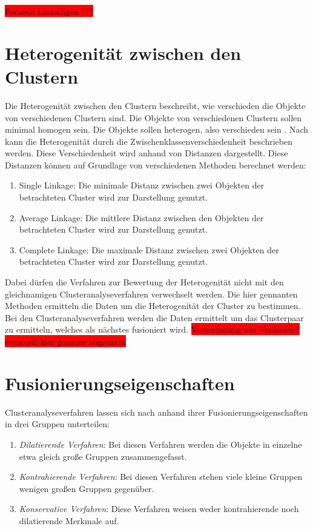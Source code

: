 \colorbox{red}{Formeln hinzufügen ???}
\section{Heterogenität zwischen den Clustern}
Die Heterogenität zwischen den Clustern beschreibt, wie verschieden die Objekte von verschiedenen Clustern sind. Die Objekte von verschiedenen Clustern sollen minimal homogen sein. Die Objekte sollen heterogen, also verschieden sein \citep[Vgl.][S. 16]{Bacher.2010}.
Nach \citet[S. 181]{Bankhofer.2008} kann die Heterogenität durch die Zwischenklassenverschiedenheit beschrieben werden. Diese Verschiedenheit wird anhand von Distanzen dargestellt. Diese Distanzen können auf Grundlage von verschiedenen Methoden berechnet werden:
\begin{enumerate}
        \item Single Linkage: Die minimale Distanz zwischen zwei Objekten der betrachteten Cluster wird zur Darstellung genutzt.
        \item Average Linkage: Die mittlere Distanz zwischen den Objekten der betrachteten Cluster wird zur Darstellung genutzt.
        \item Complete Linkage: Die maximale Distanz zwischen zwei Objekten der betrachteten Cluster wird zur Darstellung genutzt.
\end{enumerate}
Dabei dürfen die Verfahren zur Bewertung der Heterogenität nicht mit den gleichnamigen Clusteranalyseverfahren verwechselt werden. Die hier gennanten Methoden ermitteln die Daten um die Heterogenität der Cluster zu bestimmen. Bei den Clusteranalyseverfahren werden die Daten ermittelt um das Clusterpaar zu ermitteln, welches als nächstes fusioniert wird. 
\colorbox{red}{Verwechslung mit Verfahren? eventuell hier genauer abgrenzen} 

\section{Fusionierungseigenschaften}
Clusteranalyseverfahren lassen sich nach \citet[S. 488/489]{Backhaus.2016} anhand ihrer Fusionierungseigenschaften in drei Gruppen unterteilen:
\begin{enumerate}
        \item \textit{Dilatierende Verfahren}: Bei diesen Verfahren werden die Objekte in einzelne etwa gleich große Gruppen zusammengefasst.
        \item \textit{Kontrahierende Verfahren}: Bei diesen Verfahren stehen viele kleine Gruppen wenigen großen Gruppen gegenüber.
        \item \textit{Konservative Verfahren}: Diese Verfahren weisen weder kontrahierende noch dilatierende Merkmale auf.
\end{enumerate}
